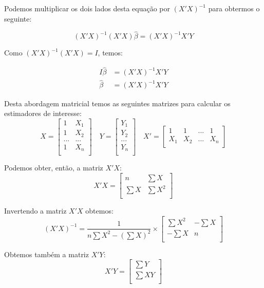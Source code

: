\documentclass[]{ufpe-exercises}
\begin{document}
\begin{questions}
\begin{solution}
		Podemos multiplicar os dois lados desta equação por \((X'X)^{-1}\) para obtermos o seguinte:

		\[(X'X)^{-1}(X'X)\hat{\beta} = (X'X)^{-1}X'Y\]

		Como \((X'X)^{-1}(X'X) = I\), temos:

		\begin{align*}
			I\hat{\beta} & = (X'X)^{-1}X'Y \\
			\hat{\beta}  & = (X'X)^{-1}X'Y
		\end{align*}

		Desta abordagem matricial temos as seguintes matrizes para calcular os estimadores de interesse:
		\[ X =
			\begin{bmatrix}
				1   & X_{1} \\
				1   & X_{2} \\
				... & ...   \\
				1   & X_{n} \\
			\end{bmatrix} \quad
			Y =
			\begin{bmatrix}
				Y_{1} \\
				Y_{2} \\
				...   \\
				Y_{n} \\
			\end{bmatrix} \quad
			X' =
			\begin{bmatrix}
				1     & 1     & ... & 1     \\
				X_{1} & X_{2} & ... & X_{n} \\
			\end{bmatrix}
		\]

		Podemos obter, então, a matriz \(X'X\):
		\[  X'X =
			\begin{bmatrix}
				n      & \sum X     \\
				\sum X & \sum X^{2} \\
			\end{bmatrix}
		\]

		Invertendo a matriz \(X'X\) obtemos:
		\[(X'X)^{-1} = \frac{1}{n \sum X^{2} - (\sum X)^{2}} \times
			\begin{bmatrix}
				\sum X^{2} & -\sum X \\
				-\sum X    & n       \\
			\end{bmatrix}
		\]

		Obtemos também a matriz \(X'Y\):
		\[  X'Y =
			\begin{bmatrix}
				\sum Y  \\
				\sum XY \\
			\end{bmatrix}
		\]


\end{solution}
\end{questions}
\end{document}
